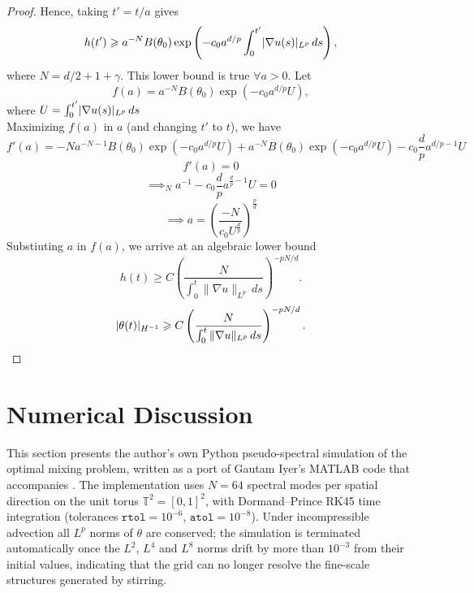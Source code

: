 \documentclass[12pt]{report}   %
\renewcommand{\geq}{\geqslant}
\newcommand{\grad}{\nabla}
\numberwithin{equation}{section}
\theoremstyle{plain}
\theoremstyle{definition}
\theoremstyle{remark}
\DeclarePairedDelimiter{\norm}{|}{|}
\DeclarePairedDelimiter{\paren}{(}{)}
\begin{document}
\begin{proof}
    Hence, taking $t'=t/a$ gives
    \[ h(t') \geq  a^{-N}B(\theta_0) \exp \left(-c_0 a^{d/p}  \int_0^{t'} \norm{\grad u(s)}_{L^p} \, ds \right), \]
    where $N= d/2+1+\gamma.$
This  lower bound is true $\forall a>0.$ %
Let 
\[ f(a) =  a^{-N}B(\theta_0) \exp \left(-c_0 a^{d/p} U \right),  \]
where $U = \int_0^{t'} \norm{\grad u(s)}_{L^p} \, ds$ \\
Maximizing $f(a)$ in $a$ (and changing $t'$ to $t$), we have
\[ f'(a) = -Na^{-N-1}B(\theta_0) \exp \left(-c_0 a^{d/p} U \right) + a^{-N}B(\theta_0) \exp \left(-c_0 a^{d/p} U \right) -c_0 \frac{d}{p}a^{d/p -1} U\]
\[f'(a) = 0\]
\[\implies _Na^{-1} - c_0\frac{d}{p}a^{\frac{d}{p}-1}U = 0\]
\[\implies a = \left( \frac{-N}{c_0 U^{\frac{d}{p}}}\right)^{\frac{p}{d}}\]
Substiuting $a$ in $f(a)$, we arrive at an algebraic lower bound
\[
  h(t) \geq C \left( \frac{N}{\int_0^t \|\nabla u\|_{L^p}\,ds} \right)^{-pN/d}.
\]
\begin{gather*}
  \norm{\theta(t)}_{H^{-1}} \geq C \left( \frac{N}{\int_0^t \|\nabla u\|_{L^p}\,ds} \right)^{-pN/d}.
  \qedhere
\end{gather*}
  \end{proof}
  
\section{Numerical Discussion}

This section presents the author's own Python pseudo-spectral simulation of the optimal mixing problem, written as a port of Gautam Iyer's MATLAB code that accompanies \cite{IyerKiselevEA14,opt}. The implementation uses $N = 64$ spectral modes per spatial direction on the unit torus $\mathbb{T}^2 = [0,1]^2$, with Dormand--Prince RK45 time integration (tolerances $\texttt{rtol} = 10^{-6}$, $\texttt{atol} = 10^{-8}$). Under incompressible advection all $L^p$ norms of $\theta$ are conserved; the simulation is terminated automatically once the $L^2$, $L^4$ and $L^8$ norms drift by more than $10^{-3}$ from their initial values, indicating that the grid can no longer resolve the fine-scale structures generated by stirring.
\end{document}
